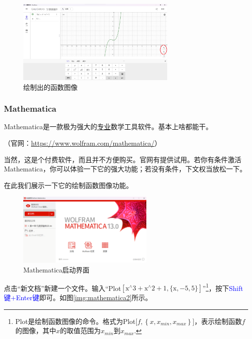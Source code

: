\documentclass[lang=cn,math=cm,chinesefont=nofont,11pt,scheme=chinese,twocol]{elegantbook}
\begin{document}
\begin{figure}[h]
  \centering
  \includegraphics[width=0.7\textwidth]{image/geogebra4.png}
  \caption{绘制出的函数图像}
  \label{img:geogebra4}
\end{figure}

\subsubsection{Mathematica}

Mathematica是一款极为强大的\underline{专业}数学工具软件。基本上啥都能干。

（官网：\href{https://www.wolfram.com/mathematica/}{https://www.wolfram.com/mathematica/}）

当然，这是个付费软件，而且并不方便购买。官网有提供试用。若你有条件激活Mathematica，你可以体验一下它的强大功能；若没有条件，下文权当放松一下。

在此我们展示一下它的绘制函数图像功能。

\begin{figure}[h]
  \centering
  \includegraphics[width=0.6\textwidth]{image/mathematica1.png}
  \caption{Mathematica启动界面}
  \label{img:mathematica1}
\end{figure}

点击“新文档”新建一个文件。输入“Plot$\left[\text{x}^{\land}3+\text{x}^{\land}2+1,\{\text{x},-5,5\}\right]$”\footnote{Plot是绘制函数图像的命令。格式为Plot[$f,\left\{x,x_{min},x_{max}\right\}$]，表示绘制函数$f$的图像，其中$x$的取值范围为$x_{min}$到$x_{max}$.}，按下\textcolor{blue}{Shift键+Enter键}即可。如图\ref{img:mathematica2}所示。
\end{document}
